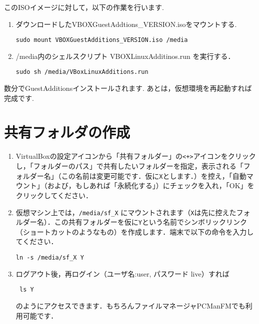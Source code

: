 \documentclass[a4j]{ltjsarticle}
\begin{document}
このISOイメージに対して，以下の作業を行います. 
\begin{enumerate}
 \item ダウンロードしたVBOXGuestAddtions\_VERSION.isoをマウントする. 
\begin{lstlisting}
sudo mount VBOXGuestAdditions_VERSION.iso /media
\end{lstlisting}
 \item /media内のシェルスクリプト VBOXLinuxAdditinos.run を実行する．
\begin{lstlisting}
sudo sh /media/VBoxLinuxAdditions.run
\end{lstlisting}
\end{enumerate}
数分でGuestAdditionsインストールされます. 
あとは，仮想環境を再起動すれば完成です. 

\section{共有フォルダの作成}
\begin{enumerate}
 \item VirtualBoxの設定アイコンから「共有フォルダー」の\verb|<+>|アイコンをクリックし，「フォルダーのパス」で共有したいフォルダーを指定，表示される「フォルダー名」（この名前は変更可能です．仮に\verb|X|とします．）を控え，「自動マウント」（および，もしあれば「永続化する」）にチェックを入れ，「OK」をクリックしてください．
 \item 仮想マシン上では，\verb|/media/sf_X| にマウントされます（\verb|X|は先に控えたフォルダー名）．この共有フォルダーを仮に\verb|Y|という名前でシンボリックリンク（ショートカットのようなもの）を作成します．端末で以下の命令を入力してください．
\begin{lstlisting}
ln -s /media/sf_X Y
\end{lstlisting}
\item ログアウト後，再ログイン（ユーザ名:user, パスワード live）すれば
\begin{lstlisting}
 ls Y
\end{lstlisting}
のようにアクセスできます．もちろんファイルマネージャPCManFMでも利用可能です．
\end{enumerate}

\end{document}
